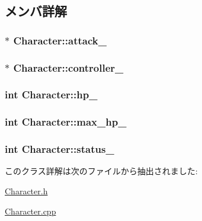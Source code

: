 \subsection{メンバ詳解}
\hypertarget{class_character_a54a04aba4002a2ca97e4b26f2d134d55}{
\subsubsection[{attack\+\_\+}]{$\ast$ Character\+::attack\+\_\+\hspace{0.3cm}{\ttfamily [protected]}}}\label{class_character_a54a04aba4002a2ca97e4b26f2d134d55}
\hypertarget{class_character_ac2aa119a9bef3db8ca9bbed9040ad6d2}{
\subsubsection[{controller\+\_\+}]{$\ast$ Character\+::controller\+\_\+\hspace{0.3cm}{\ttfamily [protected]}}}\label{class_character_ac2aa119a9bef3db8ca9bbed9040ad6d2}
\hypertarget{class_character_a9434f06db3acc96bb5646a0f287c3692}{
\subsubsection[{hp\+\_\+}]{\setlength{\rightskip}{0pt plus 5cm}int Character\+::hp\+\_\+\hspace{0.3cm}{\ttfamily [protected]}}}\label{class_character_a9434f06db3acc96bb5646a0f287c3692}
\hypertarget{class_character_a38ef78d8db07674b25dfd360b4d6415e}{
\subsubsection[{max\+\_\+hp\+\_\+}]{\setlength{\rightskip}{0pt plus 5cm}int Character\+::max\+\_\+hp\+\_\+\hspace{0.3cm}{\ttfamily [protected]}}}\label{class_character_a38ef78d8db07674b25dfd360b4d6415e}
\hypertarget{class_character_aa27916b9cbe1108d86c3e43f64afc0f9}{
\subsubsection[{status\+\_\+}]{\setlength{\rightskip}{0pt plus 5cm}int Character\+::status\+\_\+\hspace{0.3cm}{\ttfamily [protected]}}}\label{class_character_aa27916b9cbe1108d86c3e43f64afc0f9}


このクラス詳解は次のファイルから抽出されました\+:\begin{DoxyCompactItemize}
\item 
\hyperlink{_character_8h}{Character.\+h}\item 
\hyperlink{_character_8cpp}{Character.\+cpp}\end{DoxyCompactItemize}
